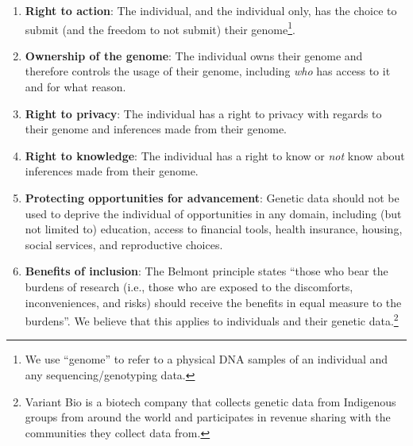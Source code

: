 \begin{enumerate}
    \item \textbf{Right to action}: The individual, and the individual only, has the choice to submit (and the freedom to not submit) their genome\footnote{We use ``genome'' to refer to a physical DNA samples of an individual and any sequencing/genotyping data.}.
    \item \textbf{Ownership of the genome}: The individual owns their genome and therefore controls the usage of their genome, including \textit{who} has access to it and for what reason.
    \item \textbf{Right to privacy}: The individual has a right to privacy with regards to their genome and inferences made from their genome.
    \item \textbf{Right to knowledge}: The individual has a right to know or \textit{not} know about inferences made from their genome. 
    \item \textbf{Protecting opportunities for advancement}: Genetic data should not be used to deprive the individual of opportunities in any domain, including (but not limited to) education, access to financial tools, health insurance, housing, social services, and reproductive choices. 
    \item \textbf{Benefits of inclusion}: The Belmont principle states ``those who bear the burdens of research (i.e., those who are exposed to the discomforts, inconveniences, and risks) should receive the benefits in equal measure to the burdens''\cite{belmont_report}. We believe that this applies to individuals and their genetic data.\footnote{Variant Bio is a biotech company that collects genetic data from Indigenous groups from around the world and participates in revenue sharing with the communities they collect data from.}
\end{enumerate}

